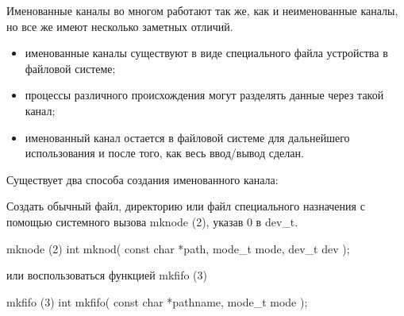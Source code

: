 Именованные каналы во многом работают так же, как и неименованные каналы, но все же имеют несколько заметных отличий.

\begin{itemize}
	\item именованные каналы существуют в виде специального файла устройства в файловой системе;
	\item процессы различного происхождения могут разделять данные через такой канал;
	\item именованный канал остается в файловой системе для дальнейшего использования и после того, как весь ввод/вывод сделан.
\end{itemize}


Существует два способа создания именованного канала:

Создать обычный файл, директорию или файл специального назначения с помощью системного вызова mknode (2), указав 0 в dev_t.

\begin{CCode}{mknode (2)}
	int mknod(
		const char *path, 
		mode_t mode, 
		dev_t dev
	); \end{CCode}

или воспользоваться функцией mkfifo (3)

\begin{CCode}{mkfifo (3)}
	int mkfifo(
		const char *pathname, 
		mode_t mode
	); \end{CCode}
